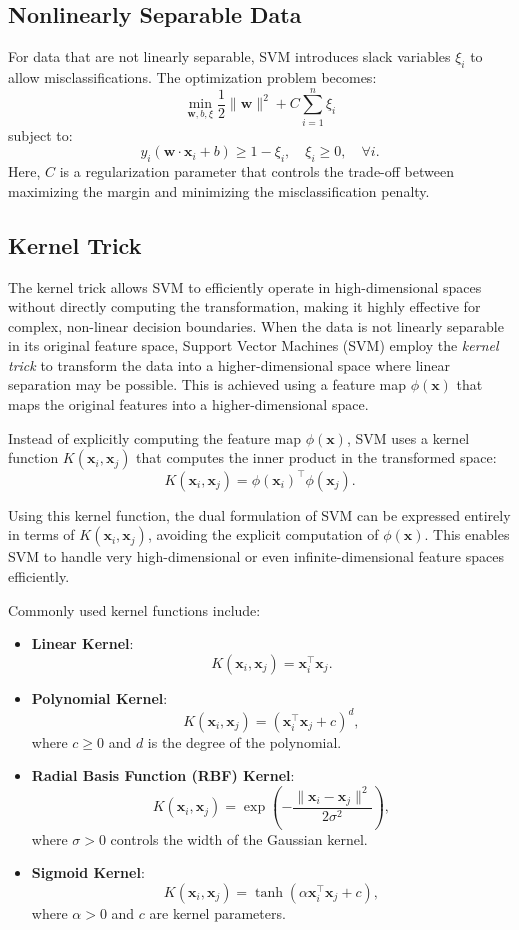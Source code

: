 \documentclass{article}
\begin{document}
\subsection*{Nonlinearly Separable Data}

For data that are not linearly separable, SVM introduces slack variables \( \xi_i \) to allow misclassifications. The optimization problem becomes:
\[
\min_{\mathbf{w}, b, \xi} \frac{1}{2} \|\mathbf{w}\|^2 + C \sum_{i=1}^{n} \xi_i
\]
subject to:
\[
y_i (\mathbf{w} \cdot \mathbf{x}_i + b) \geq 1 - \xi_i, \quad \xi_i \geq 0, \quad \forall i.
\]
Here, \( C \) is a regularization parameter that controls the trade-off between maximizing the margin and minimizing the misclassification penalty.

\subsection*{Kernel Trick}
The kernel trick allows SVM to efficiently operate in high-dimensional spaces without directly computing the transformation, making it highly effective for complex, non-linear decision boundaries.
When the data is not linearly separable in its original feature space, Support Vector Machines (SVM) employ the \textit{kernel trick} to transform the data into a higher-dimensional space where linear separation may be possible. This is achieved using a feature map $\phi(\mathbf{x})$ that maps the original features into a higher-dimensional space.

\noindent
Instead of explicitly computing the feature map $\phi(\mathbf{x})$, SVM uses a kernel function $K(\mathbf{x}_i, \mathbf{x}_j)$ that computes the inner product in the transformed space:
\[
K(\mathbf{x}_i, \mathbf{x}_j) = \phi(\mathbf{x}_i)^\top \phi(\mathbf{x}_j).
\]

\noindent
Using this kernel function, the dual formulation of SVM can be expressed entirely in terms of $K(\mathbf{x}_i, \mathbf{x}_j)$, avoiding the explicit computation of $\phi(\mathbf{x})$. This enables SVM to handle very high-dimensional or even infinite-dimensional feature spaces efficiently.


\noindent
Commonly used kernel functions include:
\begin{itemize}
    \item \textbf{Linear Kernel}:
    \[
    K(\mathbf{x}_i, \mathbf{x}_j) = \mathbf{x}_i^\top \mathbf{x}_j.
    \]
    \item \textbf{Polynomial Kernel}:
    \[
    K(\mathbf{x}_i, \mathbf{x}_j) = (\mathbf{x}_i^\top \mathbf{x}_j + c)^d,
    \]
    where $c \geq 0$ and $d$ is the degree of the polynomial.
    \item \textbf{Radial Basis Function (RBF) Kernel}:
    \[
    K(\mathbf{x}_i, \mathbf{x}_j) = \exp\left(-\frac{\|\mathbf{x}_i - \mathbf{x}_j\|^2}{2\sigma^2}\right),
    \]
    where $\sigma > 0$ controls the width of the Gaussian kernel.
    \item \textbf{Sigmoid Kernel}:
    \[
    K(\mathbf{x}_i, \mathbf{x}_j) = \tanh(\alpha \mathbf{x}_i^\top \mathbf{x}_j + c),
    \]
    where $\alpha > 0$ and $c$ are kernel parameters.
\end{itemize}
\end{document}
